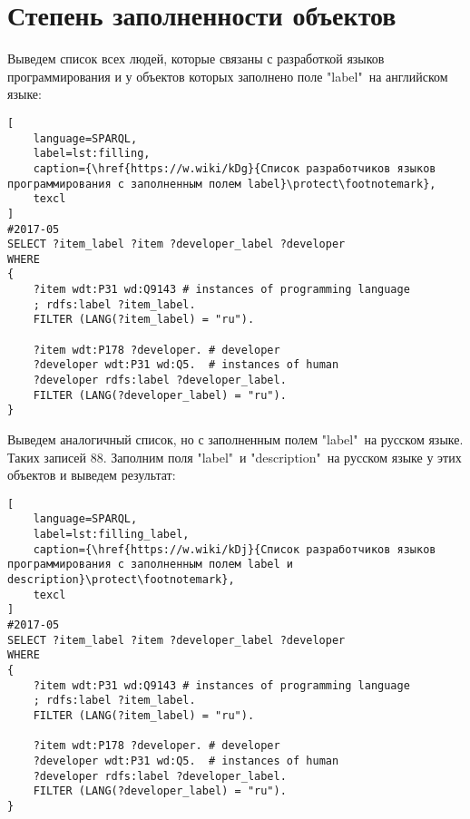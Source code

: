 \section{Степень заполненности объектов}
Выведем список всех людей, которые связаны с разработкой языков программирования и у объектов которых заполнено поле "label"\  на английском языке:

\begin{lstlisting}[
	language=SPARQL,
	label=lst:filling,
	caption={\href{https://w.wiki/kDg}{Список разработчиков языков программирования с заполненным полем label}\protect\footnotemark},
	texcl
]
#2017-05
SELECT ?item_label ?item ?developer_label ?developer
WHERE
{
    ?item wdt:P31 wd:Q9143 # instances of programming language
    ; rdfs:label ?item_label. 
    FILTER (LANG(?item_label) = "ru"). 

    ?item wdt:P178 ?developer. # developer 
    ?developer wdt:P31 wd:Q5.  # instances of human
    ?developer rdfs:label ?developer_label. 
    FILTER (LANG(?developer_label) = "ru").  
}
\end{lstlisting}
Выведем аналогичный список, но с заполненным полем "label"\  на русском языке. Таких записей 88. Заполним поля "label"\  и "description"\  на русском языке у этих объектов и выведем результат:

\begin{lstlisting}[
	language=SPARQL,
	label=lst:filling_label,
	caption={\href{https://w.wiki/kDj}{Список разработчиков языков программирования с заполненным полем label и description}\protect\footnotemark},
	texcl
]
#2017-05
SELECT ?item_label ?item ?developer_label ?developer
WHERE
{
    ?item wdt:P31 wd:Q9143 # instances of programming language
    ; rdfs:label ?item_label. 
    FILTER (LANG(?item_label) = "ru"). 

    ?item wdt:P178 ?developer. # developer 
    ?developer wdt:P31 wd:Q5.  # instances of human
    ?developer rdfs:label ?developer_label. 
    FILTER (LANG(?developer_label) = "ru").  
}
\end{lstlisting}

